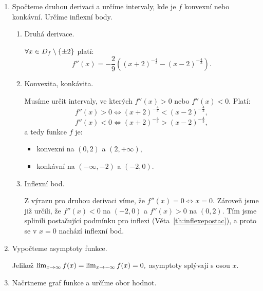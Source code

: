 \begin{example}
\begin{enumerate}
        \item Spočteme druhou derivaci a určíme intervaly, kde je $f$ konvexní
            nebo konkávní. Určíme inflexní body.
            \begin{enumerate}
                \item Druhá derivace.

                    $\forall x \in D_f \setminus \{\pm 2\}$ platí:
                    $$f''(x) = -\frac{2}{9}\left((x+2)^{-\frac{4}{3}} - (x-2)^{-\frac{4}{3}}\right).$$
                \item Konvexita, konkávita.

                    Musíme určit intervaly, ve kterých $f''(x) > 0$ nebo
                    $f''(x) < 0.$ Platí:
                    $$f''(x) > 0 \iff (x+2)^{-\frac{4}{3}} < (x-2)^{-\frac{4}{3}},$$
                    $$f''(x) < 0 \iff (x+2)^{-\frac{4}{3}} > (x-2)^{-\frac{4}{3}},$$
                    a tedy funkce $f$ je:
                    \begin{itemize}
                        \item konvexní na $(0,2)$ a $(2, +\infty),$
                        \item konkávní na $(-\infty, -2)$ a $(-2,0).$
                    \end{itemize}
                \item Inflexní bod.

                    Z výrazu pro druhou derivaci víme, že $f''(x) = 0 \iff x =0.$
                    Zároveň jsme již určili, že $f''(x) < 0$ na $(-2,0)$ a 
                    $f''(x) > 0$ na $(0,2).$ Tím jsme splinili postačující podmínku
                    pro inflexi (Věta~\ref{th:inflexepostac}), a proto se v 
                    $x=0$ nachází inflexní bod.
            \end{enumerate}
        \item Vypočteme asymptoty funkce.

            Jelikož $\lim_{x \to \infty} f(x) = \lim_{x \to -\infty} f(x) = 0,$ asymptoty splývají s
            osou $x.$

        \item Načrtneme graf funkce a určíme obor hodnot.
            \begin{center}
            \end{center}


\end{enumerate}
\end{example}
